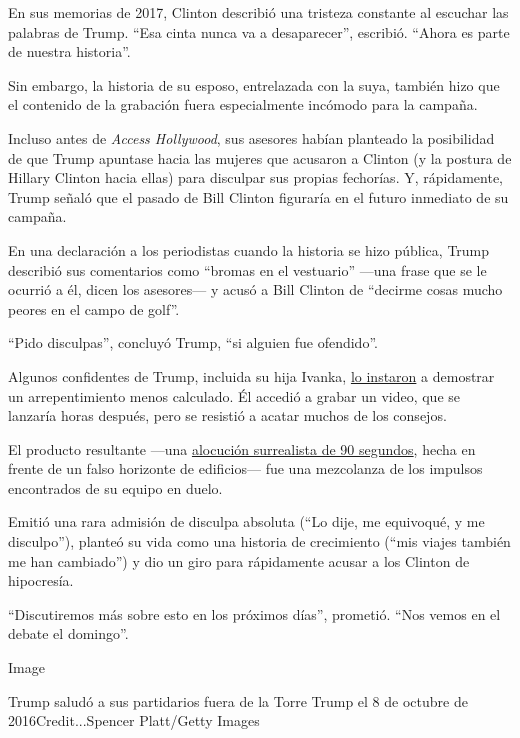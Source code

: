 En sus memorias de 2017, Clinton describió una tristeza constante al
escuchar las palabras de Trump. ``Esa cinta nunca va a desaparecer'',
escribió. ``Ahora es parte de nuestra historia''.

Sin embargo, la historia de su esposo, entrelazada con la suya, también
hizo que el contenido de la grabación fuera especialmente incómodo para
la campaña.

Incluso antes de \emph{Access Hollywood}, sus asesores habían planteado
la posibilidad de que Trump apuntase hacia las mujeres que acusaron a
Clinton (y la postura de Hillary Clinton hacia ellas) para disculpar sus
propias fechorías. Y, rápidamente, Trump señaló que el pasado de Bill
Clinton figuraría en el futuro inmediato de su campaña.

En una declaración a los periodistas cuando la historia se hizo pública,
Trump describió sus comentarios como ``bromas en el vestuario'' ---una
frase que se le ocurrió a él, dicen los asesores--- y acusó a Bill
Clinton de ``decirme cosas mucho peores en el campo de golf''.

``Pido disculpas'', concluyó Trump, ``si alguien fue ofendido''.

Algunos confidentes de Trump, incluida su hija Ivanka,
\href{https://www.nytimes.com/es/2017/05/03/espanol/ivanka-trump-la-mujer-que-mas-escucha-el-presidente-de-estados-unidos.html}{lo
instaron} a demostrar un arrepentimiento menos calculado. Él accedió a
grabar un video, que se lanzaría horas después, pero se resistió a
acatar muchos de los consejos.

El producto resultante ---una
\href{https://www.facebook.com/DonaldTrump/videos/here-is-my-statementive-never-said-im-a-perfect-person-nor-pretended-to-be-someo/10157844642270725/}{alocución
surrealista de 90 segundos}, hecha en frente de un falso horizonte de
edificios--- fue una mezcolanza de los impulsos encontrados de su equipo
en duelo.

Emitió una rara admisión de disculpa absoluta (``Lo dije, me equivoqué,
y me disculpo''), planteó su vida como una historia de crecimiento
(``mis viajes también me han cambiado'') y dio un giro para rápidamente
acusar a los Clinton de hipocresía.

``Discutiremos más sobre esto en los próximos días'', prometió. ``Nos
vemos en el debate el domingo''.

Image

Trump saludó a sus partidarios fuera de la Torre Trump el 8 de octubre
de 2016Credit...Spencer Platt/Getty Images

